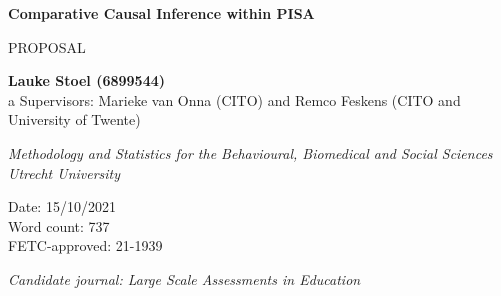 \begin{titlepage}
   \begin{center}
       \vspace*{1cm}
       
       \huge
       \textbf{Comparative Causal Inference within PISA}
       
       \Large
       \vspace{0.5cm}
        PROPOSAL
            
       \vspace{1.5cm}

       \textbf{Lauke Stoel (6899544)}\\
       
       \vspace{0.5cm}a
       Supervisors: Marieke van Onna (CITO) and \newline
       Remco Feskens (CITO and University of Twente)

       \vfill
       
       \large     
       \textit{Methodology and Statistics for the Behavioural, Biomedical and Social Sciences}\\
       
       \vspace{0.5cm}
       \textit{Utrecht University}\\
            
       \vspace{0.8cm}
       
       Date: 15/10/2021 \\
       Word count: 737 \\
       
       \vspace{0.5cm}
       FETC-approved: 21-1939\\
       
       \vfill
       
       \textit{Candidate journal: Large Scale Assessments in Education}
       
       
            
   \end{center}
\end{titlepage}